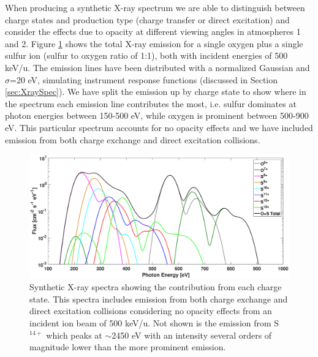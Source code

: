 \documentclass[draft]{agujournal2018}
\begin{document}
When producing a synthetic X-ray spectrum we are able to distinguish between charge states and production type (charge transfer or direct excitation) and consider the effects due to opacity at different viewing angles in atmospheres 1 and 2.
Figure \ref{fig:XraySpec} shows the total X-ray emission for a single oxygen plus a single sulfur ion (sulfur to oxygen ratio of 1:1), both with incident energies of 500 keV/u.
The emission lines have been distributed with a normalized Gaussian and $\sigma$=20 eV, simulating instrument response functions (discussed in Section \ref{sec:XraySpec}).
We have split the emission up by charge state to show where in the spectrum each emission line contributes the most, i.e. sulfur dominates at photon energies between 150-500 eV, while oxygen is prominent between 500-900 eV.
This particular spectrum accounts for no opacity effects and we have included emission from both charge exchange and direct excitation collisions.

\begin{figure}[ht]
    \centering
    \includegraphics[width=\textwidth]{Figures/O+S_CX+DE_500keVNoOpacSpec.eps}
    \caption{Synthetic X-ray spectra showing the contribution from each charge state. This spectra includes emission from both charge exchange and direct excitation collisions considering no opacity effects from an incident ion beam of 500 keV/u. Not shown is the emission from S$^{14+}$ which peaks at $\sim$2450 eV with an intensity several orders of magnitude lower than the more prominent emission.}
    \label{fig:XraySpec}
\end{figure}
\end{document}
